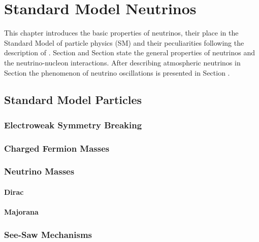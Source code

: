 \setchapterpreamble[u]{\margintoc}

\chapter{Standard Model Neutrinos}




This chapter introduces the basic properties of neutrinos, their place in the Standard Model of particle physics (SM) and their peculiarities following the description of .
Section  and Section  state the general properties of neutrinos and the neutrino-nucleon interactions.
After describing atmospheric neutrinos in Section  the phenomenon of neutrino oscillations is presented in Section .



\section{Standard Model Particles}

\subsection{Electroweak Symmetry Breaking}

\subsection{Charged Fermion Masses}

\subsection{Neutrino Masses}

\subsubsection{Dirac}

\subsubsection{Majorana}


\subsection{See-Saw Mechanisms}

